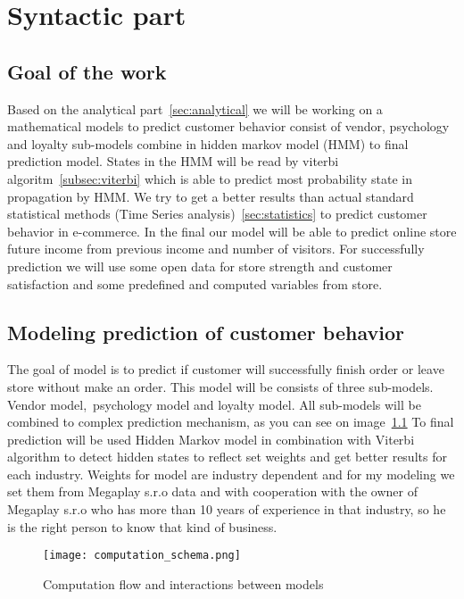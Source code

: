 
\chapter{Syntactic part}
\label{sec:methodology}
\section{Goal of the work} \label{sec:goal}
Based on the analytical part~\ref{sec:analytical} we will be working on a mathematical models to predict customer behavior consist of vendor, psychology and loyalty sub-models combine in hidden markov model (HMM) to final prediction model.
States in the HMM will be read by viterbi algoritm~\ref{subsec:viterbi} which is able to predict most probability state in propagation by HMM.
We try to get a better results than actual standard statistical methods (Time Series analysis)~\ref{sec:statistics} to predict customer behavior in e-commerce.
In the final our model will be able to predict online store future income from previous income and number of visitors.
For successfully prediction we will use some open data for store strength and customer satisfaction and some predefined and computed variables from store.
\section{Modeling prediction of customer behavior} \label{sec:modeling}
The goal of model is to predict if customer will successfully finish order or leave store without make an order.
This model will be consists of three sub-models.
Vendor model,\ psychology model and loyalty model.
All sub-models will be combined to complex prediction mechanism, as you can see on image~\ref{Model schema with interaction}
To final prediction will be used Hidden Markov model in combination with Viterbi algorithm to detect hidden states to reflect set weights and get better results for each industry.
Weights for model are industry dependent and for my modeling we set them from Megaplay s.r.o data and with cooperation with the owner of Megaplay s.r.o who has more than 10 years of experience in that industry, so he is the right person to know that kind of business.
\\
\begin{figure}[h!]
    \begin{center}
        \texttt{[image: computation\_schema.png]}
    \end{center}
    \caption{Computation flow and interactions between models}
    \label{Model schema with interaction}
\end{figure}
\\
